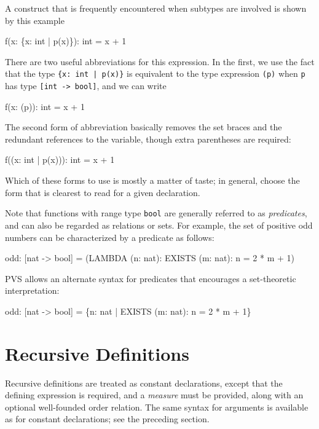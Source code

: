 A construct that is frequently encountered when subtypes are involved is
shown by this example
\begin{pvsex}
  f(x: \{x: int | p(x)\}): int = x + 1
\end{pvsex}
%
There are two useful abbreviations for this expression.  In the first, we
use the fact that the type \texttt{\{x:\ int | p(x)\}} is equivalent to
the type expression \texttt{(p)} when \texttt{p} has type \texttt{[int ->
bool]}, and we can write
\begin{pvsex}
  f(x: (p)): int = x + 1
\end{pvsex}
%
The second form of abbreviation basically removes the set braces and the
redundant references to the variable, though extra parentheses are
required:
\begin{pvsex}
  f((x: int | p(x))): int = x + 1
\end{pvsex}
%
Which of these forms to use is mostly a matter of taste; in general,
choose the form that is clearest to read for a given declaration.

Note that functions with range type \texttt{bool} are generally referred
to as \emph{predicates}, and can also be regarded as relations or sets.
For example, the set of positive odd numbers can be characterized by a
predicate as follows:
\begin{pvsex}
  odd: [nat -> bool] = (LAMBDA (n: nat): EXISTS (m: nat): n = 2 * m + 1)
\end{pvsex}
%
PVS allows an alternate syntax for predicates that encourages a
set-theoretic interpretation:
\begin{pvsex}
  odd: [nat -> bool] = \{n: nat | EXISTS (m: nat): n = 2 * m + 1\}
\end{pvsex}


\section{Recursive Definitions}\label{recursive-definitions}

Recursive definitions are treated as constant declarations, except that
the defining expression is required, and a \emph{measure} must be provided, along with an optional well-founded order
relation. The same syntax for
arguments is available as for constant declarations; see the preceding
section.

